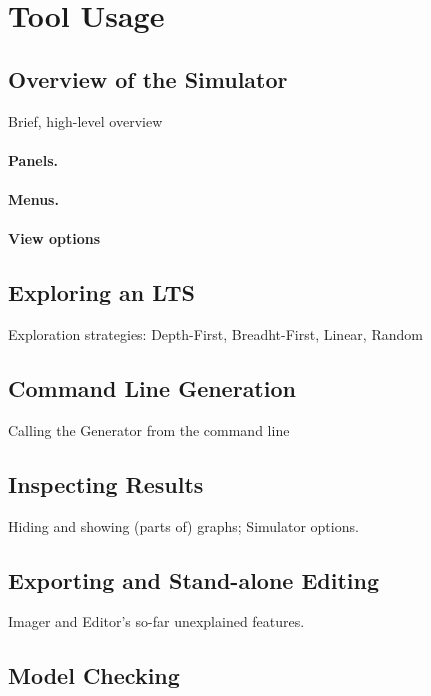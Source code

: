 \section{Tool Usage}

\subsection{Overview of the Simulator}

Brief, high-level overview

\paragraph{Panels.}

\paragraph{Menus.}

\paragraph{View options}

\subsection{Exploring an LTS}

Exploration strategies: Depth-First, Breadht-First, Linear, Random

\subsection{Command Line Generation}

Calling the Generator from the command line

\subsection{Inspecting Results}

Hiding and showing (parts of) graphs; Simulator options.

\subsection{Exporting and Stand-alone Editing}

Imager and Editor's so-far unexplained features.

\subsection{Model Checking}


